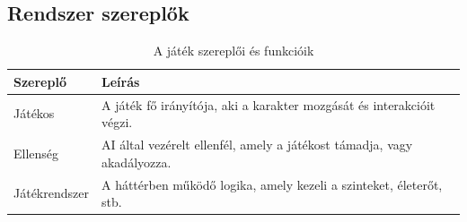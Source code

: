 \documentclass[
]{thesis-ekf}
\theoremstyle{definition}
\theoremstyle{remark}
\begin{document}
\subsection{Rendszer szereplők}
\begin{table}[h!]
	\centering
	\begin{tabular}{|p{3cm}|p{11cm}|}
		\hline
		\textbf{Szereplő} & \textbf{Leírás} \\
		\hline
		Játékos & A játék fő irányítója, aki a karakter mozgását és interakcióit végzi. \\
		\hline
		Ellenség & AI által vezérelt ellenfél, amely a játékost támadja, vagy akadályozza. \\
		\hline
		Játékrendszer & A háttérben működő logika, amely kezeli a szinteket, életerőt, stb. \\
		\hline
	\end{tabular}
	\caption{A játék szereplői és funkcióik}
\end{table}
\end{document}
